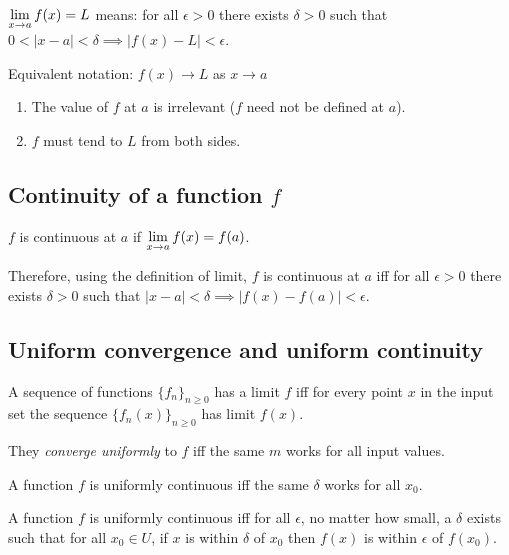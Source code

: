 \begin{definition*}~\\
$\LimEq{f(x)}{L}{x}{a}$ means: for all $\epsilon > 0$ there exists $\delta > 0$ such that
$0 < |x - a| < \delta \implies |f(x) - L| < \epsilon$.
\end{definition*}

Equivalent notation: $f(x) \to L$ as $x \to a$

\begin{remark*}\hspace{0pt}
  \begin{enumerate}
  \item The value of $f$ at $a$ is irrelevant ($f$ need not be defined at $a$).
  \item $f$ must tend to $L$ from both sides.
  \end{enumerate}
\end{remark*}

\subsection{Continuity of a function $f$}

\begin{definition*}
$f$ is continuous at $a$ if $\LimEq{f(x)}{f(a)}{x}{a}$.
\end{definition*}

Therefore, using the definition of limit, $f$ is continuous at $a$ iff for all $\epsilon > 0$
there exists $\delta > 0$ such that $|x - a| < \delta \implies |f(x) - f(a)| < \epsilon$.

\subsection{Uniform convergence and uniform continuity}

\begin{definition*}
A sequence of functions $\{f_n\}_{n\geq 0}$ has a limit $f$ iff for every point
$x$ in the input set the sequence $\{f_n(x)\}_{n\geq 0}$ has limit $f(x)$.

They \textit{converge uniformly} to $f$ iff the same $m$ works for all input
values.
\end{definition*}

\begin{definition*}
A function $f$ is uniformly continuous iff the same $\delta$ works for all $x_0$.

A function $f$ is uniformly continuous iff for all $\epsilon$, no matter how
small, a $\delta$ exists such that for all $x_0 \in U$, if $x$ is within
$\delta$ of $x_0$ then $f(x)$ is within $\epsilon$ of $f(x_0)$.
\end{definition*}

